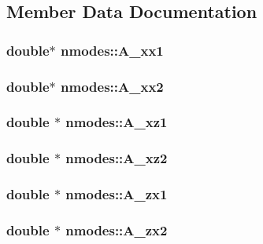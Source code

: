 \subsection{Member Data Documentation}
\subsubsection{\setlength{\rightskip}{0pt plus 5cm}double$\ast$ {\bf nmodes::A\_\-xx1}}\label{structnmodes_848f806cc2fe4ab2b4a1ba54d79260c8}


\subsubsection{\setlength{\rightskip}{0pt plus 5cm}double$\ast$ {\bf nmodes::A\_\-xx2}}\label{structnmodes_8b7cfc7448bb0d15adcf48ece0a0efdb}


\subsubsection{\setlength{\rightskip}{0pt plus 5cm}double $\ast$ {\bf nmodes::A\_\-xz1}}\label{structnmodes_94bc77fcefdadd08873e66c9997184bd}


\subsubsection{\setlength{\rightskip}{0pt plus 5cm}double $\ast$ {\bf nmodes::A\_\-xz2}}\label{structnmodes_b1336bb91e295cf064a766b2164ee6f4}


\subsubsection{\setlength{\rightskip}{0pt plus 5cm}double $\ast$ {\bf nmodes::A\_\-zx1}}\label{structnmodes_eea88ba87f3e18afc8ebf57c1d351d3a}


\subsubsection{\setlength{\rightskip}{0pt plus 5cm}double $\ast$ {\bf nmodes::A\_\-zx2}}\label{structnmodes_65d35bc169e1ea758129e3258aae67c0}


